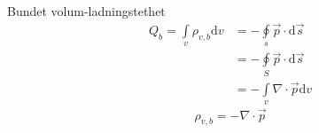 \documentclass[a4paper,10pt,english]{article}
\newcommand{\dd}[1]{\mathrm{d}#1}
\begin{document}
Bundet volum-ladningstethet
\begin{align*}
	Q_b = \int \limits_v \rho_{v,b} \dd{ v} &= - \oint \limits_s \vec{p} \cdot \dd{ \vec{s}} \\
						&= - \oint \limits_S \vec{p} \cdot \dd{ \vec{s}}\\
						&= - \int\limits_v \nabla \cdot \vec{p} \dd{ v} 
\end{align*}
\[
	\boxed{\rho_{v,b} = - \nabla \cdot \vec{p}}
\] 
\end{document}

